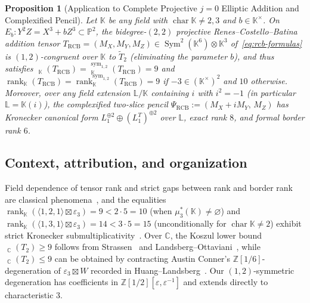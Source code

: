 \documentclass[11pt,reqno]{amsart}
\newtheorem{proposition}[theorem]{Proposition}
\theoremstyle{definition}
\theoremstyle{remark}
\numberwithin{equation}{section}
\newcommand{\KK}{\mathbb{K}}
\newcommand{\LL}{\mathbb{L}}
\newcommand{\CC}{\mathbb{C}}
\newcommand{\ZZ}{\mathbb{Z}}
\newcommand{\PP}{\mathbb{P}}
\DeclareMathOperator{\rk}{rank}
\DeclareMathOperator{\brk}{\underline{rank}}
\DeclareMathOperator{\Sym}{Sym}
\DeclareMathOperator{\chr}{char}
\begin{document}
\begin{proposition}[Application to Complete Projective $j = 0$ Elliptic Addition and Complexified Pencil]\label{prop:rcb}
Let $\KK$ be any field with $\chr\KK \neq 2, 3$ and $b \in \KK^\times$. On $E_b : Y^2 Z = X^3 + b Z^3 \subset \PP^2$, the bidegree-$(2,2)$ projective Renes--Costello--Batina addition tensor $T_{\mathrm{RCB}} = (M_X, M_Y, M_Z) \in \Sym^2(\KK^6) \otimes \KK^3$ of~\eqref{eq:rcb-formulas} is $(1,2)$-congruent over $\KK$ to $\widetilde{T}_2$ (eliminating the parameter $b$), and thus satisfies $\brk_{\KK}(T_{\mathrm{RCB}}) = \brk_{\KK}^{\mathrm{sym}_{1,2}}(T_{\mathrm{RCB}}) = 9$ and $\rk_{\KK}(T_{\mathrm{RCB}}) = \rk_{\KK}^{\mathrm{sym}_{1,2}}(T_{\mathrm{RCB}}) = 9$ if $-3 \in (\KK^\times)^2$ and $10$ otherwise. Moreover, over any field extension $\LL/\KK$ containing $i$ with $i^2 = -1$ (in particular $\LL = \KK(i)$), the complexified two-slice pencil $\Psi_{\mathrm{RCB}} := (M_X + i M_Y,\, M_Z)$ has Kronecker canonical form $L_1^{\oplus 2} \oplus (L_1^T)^{\oplus 2}$ over $\LL$, exact rank $8$, and formal border rank $6$.
\end{proposition}

\subsection*{Context, attribution, and organization}
Field dependence of tensor rank and strict gaps between rank and border rank are classical phenomena~\cite{Bini1980,BCS1997,deSilvaLim2008,Landsberg2012,Strassen1973,Strassen1983}, and the equalities $\rk_{\KK}(\langle 1, 2, 1 \rangle \boxtimes \varepsilon_3) = 9 < 2 \cdot 5 = 10$ (when $\mu_3^*(\KK) \neq \varnothing$) and $\rk_{\KK}(\langle 1, 3, 1 \rangle \boxtimes \varepsilon_3) = 14 < 3 \cdot 5 = 15$ (unconditionally for $\chr\KK \neq 2$) exhibit strict Kronecker submultiplicativity~\cite{CJZ2018,CHL2023}. Over $\CC$, the Koszul lower bound $\brk_{\CC}(T_2) \ge 9$ follows from Strassen~\cite{Strassen1983} and Landsberg--Ottaviani~\cite{LandsbergOttaviani2013}, while $\brk_{\CC}(T_2) \le 9$ can be obtained by contracting Austin Conner's $\ZZ[1/6]$-degeneration of $\varepsilon_3 \boxtimes W$ recorded in Huang--Landsberg~\cite[Proposition~8.4]{HuangLandsberg2026}. Our $(1,2)$-symmetric degeneration has coefficients in $\ZZ[1/2][\varepsilon, \varepsilon^{-1}]$ and extends directly to characteristic $3$.
\end{document}
